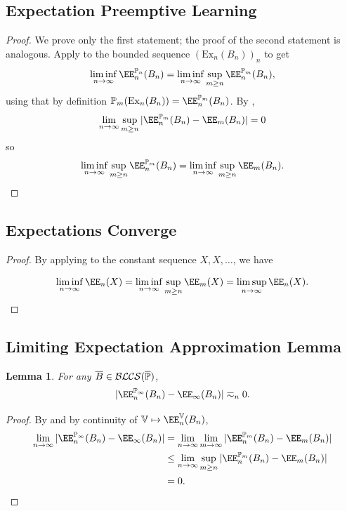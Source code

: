 \documentclass[authordate,onecolumn,noenvironments]{miri-tech-article}
\numberwithin{equation}{subsection}
\newtheorem{lemma}[theorem]{Lemma}
\newcommand{\seq}[1]{{\overline{#1}}}
\newcommand{\mm}{m}
\newcommand{\nn}{n}
\newcommand{\affluv}{B} %
\newcommand{\BLCS}[1][\MP]{\mathcal{B\-L\-C\-S}(#1)} %
\newcommand{\alta}{\mathrm{Ex}} %
\newcommand{\BelState}{\mathbb{P}}
\newcommand{\Valuation}{\mathbb{V}}
\newcommand{\pt}{\BelState}
\newcommand{\MP}{\seq{\pt}}
\begin{document}
\subsection{Expectation Preemptive Learning}\label{app:exppolymax}

\exppolymax*
\begin{proof}
  We prove only the first statement; the proof of the second statement is analogous.
  Apply  to the bounded sequence $(\alta_n(\affluv_\nn))_n$ to get
  \[
    \liminf_{\nn\to\infty} \EE_n^{\pt_\nn}(\affluv_\nn) = \liminf_{\nn\rightarrow\infty}\sup_{\mm\geq \nn} \EE_n^{\pt_m}(\affluv_n),
  \]
  using that by definition $\pt_m (\alta_n(\affluv_\nn)) = \EE_n^{\pt_m}(\affluv_n)$.
  By ,
  \[
    \lim_{\nn\rightarrow\infty}\sup_{\mm\geq \nn} |\EE_n^{\pt_m}(\affluv_n) - \EE_m(\affluv_n)| = 0
  \]
  so
  \[
\liminf_{\nn\rightarrow\infty}\sup_{\mm\geq \nn} \EE_n^{\pt_m}(\affluv_n) =
\liminf_{\nn\rightarrow\infty}\sup_{\mm\geq \nn} \EE_m(\affluv_n).
  \]
\end{proof}

\subsection{Expectations Converge}\label{sec:exc}\label{app:ec}

\restateec*
\begin{proof}
  By applying  to the constant sequence $X, X, \ldots$, we have

  \[ \liminf_{n \to \infty} \EE_n(X) = \liminf_{n \to \infty} \sup_{m \geq n} \EE_m(X) = \limsup_{n \to \infty} \EE_n(X) . \]
\end{proof}

\subsection{Limiting Expectation Approximation Lemma}\label{app:limexpapprox}

\begin{lemma}\label{lem:limexpapprox}
  For any $\seq\affluv \in \BLCS$,
  \[ | \EE_n^{\pt_\infty}(\affluv_n) - \EE_\infty(\affluv_n)| \eqsim_n 0.\]
\end{lemma}
\begin{proof}
  By  and by continuity of $\Valuation \mapsto \EE_n^{\Valuation}(\affluv_n)$,
  \begin{align*}
   \lim_{n \to \infty} | \EE_n^{\pt_\infty}(\affluv_n) - \EE_\infty(\affluv_n)| 
    &= \lim_{n \to \infty} \lim_{m \to \infty} | \EE_n^{\pt_m}(\affluv_n) - \EE_m(\affluv_n)| \\
        &\leq \lim_{n \to \infty} \sup_{m \geq n} | \EE_n^{\pt_m}(\affluv_n) - \EE_m(\affluv_n)| \\
  &= 0 .
\end{align*}
\end{proof}
\end{document}
